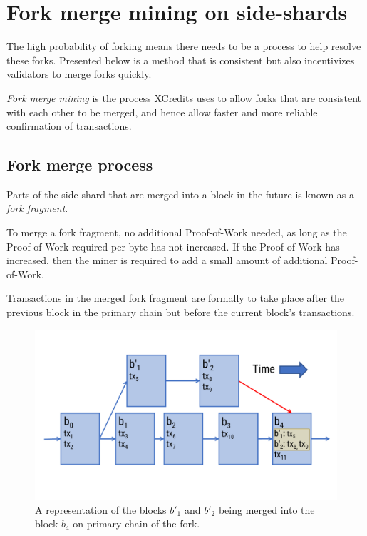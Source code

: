\documentclass[a4paper,12pt]{article}
\begin{document}
\section{Fork merge mining on side-shards}\label{fork-merge-mining}
The high probability of forking means there needs to be a process to help resolve these forks. Presented below is a method that is consistent but also incentivizes validators to merge forks quickly. 

\textit{Fork merge mining} is the process XCredits uses to allow forks that are consistent with each other to be merged, and hence allow faster and more reliable confirmation of transactions. 


\subsection{Fork merge process}
Parts of the side shard that are merged into a block in the future is known as a \textit{fork fragment}.

To merge a fork fragment, no additional Proof-of-Work needed, as long as the Proof-of-Work required per byte has not increased. If the Proof-of-Work has increased, then the miner is required to add a small amount of additional Proof-of-Work. 

Transactions in the merged fork fragment are formally to take place after the previous block in the primary chain but before the current block's transactions.


\begin{figure}[!htb]
  \centering
  \includegraphics[page=1,width=.95\textwidth]{merging} 
  \caption{A representation of the blocks $b'_1$ and $b'_2$ being merged into
  the block $b_4$ on primary chain of the fork.}
  \label{fig:merging}
\end{figure}
\FloatBarrier
\end{document}
